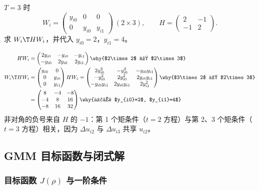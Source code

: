 \begin{exmp}[$T=3$ 时的 $W_i\T HW_i$]\label{ex:U12b-WHW}
$T=3$ 时
\[
W_i=\begin{pmatrix}y_{i0} & 0 & 0\\ 0 & y_{i0} & y_{i1}\end{pmatrix}\ (2\times3),\qquad H=\begin{pmatrix}2 & -1\\ -1 & 2\end{pmatrix}.
\]
求 $W_i\T HW_i$，并代入 $y_{i0}=2$，$y_{i1}=4$。

\solution
\begin{align*}
HW_i &= \begin{pmatrix}2y_{i0} & -y_{i0} & -y_{i1}\\ -y_{i0} & 2y_{i0} & 2y_{i1}\end{pmatrix} \why{$2\times2$ 乘 $2\times3$}\\
W_i\T HW_i &= \begin{pmatrix}y_{i0} & 0\\ 0 & y_{i0}\\ 0 & y_{i1}\end{pmatrix}HW_i
=\begin{pmatrix}2y_{i0}^2 & -y_{i0}^2 & -y_{i0}y_{i1}\\ -y_{i0}^2 & 2y_{i0}^2 & 2y_{i0}y_{i1}\\ -y_{i0}y_{i1} & 2y_{i0}y_{i1} & 2y_{i1}^2\end{pmatrix} \why{$3\times2$ 乘 $2\times3$}\\
&= \begin{pmatrix}8 & -4 & -8\\ -4 & 8 & 16\\ -8 & 16 & 32\end{pmatrix} \why{代入 $y_{i0}=2$, $y_{i1}=4$}
\end{align*}
非对角的负号来自 $H$ 的 $-1$：第 1 个矩条件（$t=2$ 方程）与第 2、3 个矩条件（$t=3$ 方程）相关，因为 $\Delta u_{i2}$ 与 $\Delta u_{i3}$ 共享 $u_{i2}$。
\end{exmp}

\subsection{GMM 目标函数与闭式解}

\subsubsection{目标函数 \texorpdfstring{$J(\rho)$}{J(rho)} 与一阶条件}

